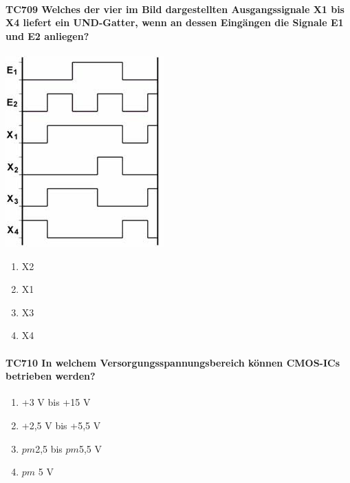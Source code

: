 \documentclass[8pt]{article}
\begin{document}
\begin{enumerate}
\begin{enumerate}[nolistsep,label=\Alph*]
{\begin{enumerate}[nolistsep,label=\Alph*]
\paragraph*{TC709 Welches der vier im Bild dargestellten Ausgangssignale X1 bis X4 liefert ein UND-Gatter, wenn an dessen Eingängen die Signale E1 und E2 anliegen?}
\begin{center}
	\begin{minipage}{\linewidth}
		\centering
		\includegraphics[scale=1.0]{pics/tc709_a.jpg}
	\end{minipage}
\end{center}
\begin{enumerate}[nolistsep,label=\Alph*]
\item X2
\item X1
\item X3
\item X4
\end{enumerate}

\paragraph*{TC710 In welchem Versorgungsspannungsbereich können CMOS-ICs betrieben werden?}
\begin{enumerate}[nolistsep,label=\Alph*]
\item +3 V bis +15 V
\item +2,5 V bis +5,5 V
\item $pm$2,5 bis $pm$5,5 V
\item $pm$ 5 V
\end{enumerate}


\end{enumerate}}
\end{enumerate}
\end{enumerate}
\end{document}
